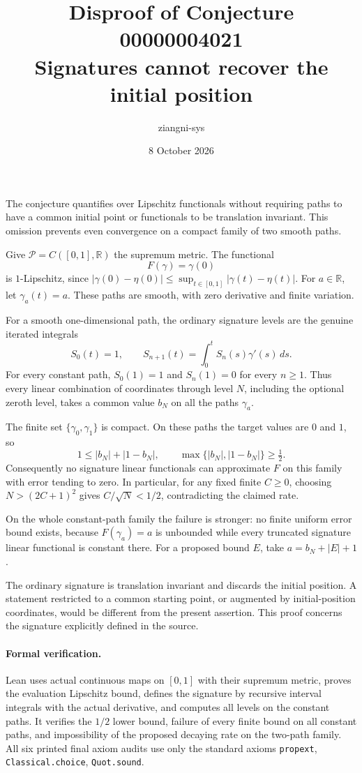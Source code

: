 \documentclass[11pt]{article}
\title{Disproof of Conjecture 00000004021\\Signatures cannot recover the initial position}
\author{ziangni-sys}
\date{8 October 2026}
\begin{document}
\maketitle
The conjecture quantifies over Lipschitz functionals without requiring paths to have a common initial point or functionals to be translation invariant. This omission prevents even convergence on a compact family of two smooth paths.

Give $\mathcal P=C([0,1],\mathbb R)$ the supremum metric. The functional
\[
 F(\gamma)=\gamma(0)
\]
is $1$-Lipschitz, since $|\gamma(0)-\eta(0)|\le\sup_{t\in[0,1]}|\gamma(t)-\eta(t)|$. For $a\in\mathbb R$, let $\gamma_a(t)=a$. These paths are smooth, with zero derivative and finite variation.

For a smooth one-dimensional path, the ordinary signature levels are the genuine iterated integrals
\[
 S_0(t)=1,\qquad S_{n+1}(t)=\int_0^t S_n(s)\gamma'(s)\,ds.
\]
For every constant path, $S_0(1)=1$ and $S_n(1)=0$ for every $n\ge1$. Thus every linear combination of coordinates through level $N$, including the optional zeroth level, takes a common value $b_N$ on all the paths $\gamma_a$.

The finite set $\{\gamma_0,\gamma_1\}$ is compact. On these paths the target values are $0$ and $1$, so
\[
 1\le |b_N|+|1-b_N|,\qquad
 \max\{|b_N|,|1-b_N|\}\ge\tfrac12.
\]
Consequently no signature linear functionals can approximate $F$ on this family with error tending to zero. In particular, for any fixed finite $C\ge0$, choosing $N>(2C+1)^2$ gives $C/\sqrt N<1/2$, contradicting the claimed rate.

On the whole constant-path family the failure is stronger: no finite uniform error bound exists, because $F(\gamma_a)=a$ is unbounded while every truncated signature linear functional is constant there. For a proposed bound $E$, take $a=b_N+|E|+1$.

The ordinary signature is translation invariant and discards the initial position. A statement restricted to a common starting point, or augmented by initial-position coordinates, would be different from the present assertion. This proof concerns the signature explicitly defined in the source.

\paragraph{Formal verification.}
Lean uses actual continuous maps on $[0,1]$ with their supremum metric, proves the evaluation Lipschitz bound, defines the signature by recursive interval integrals with the actual derivative, and computes all levels on the constant paths. It verifies the $1/2$ lower bound, failure of every finite bound on all constant paths, and impossibility of the proposed decaying rate on the two-path family. All six printed final axiom audits use only the standard axioms \texttt{propext}, \texttt{Classical.choice}, \texttt{Quot.sound}.
\end{document}
